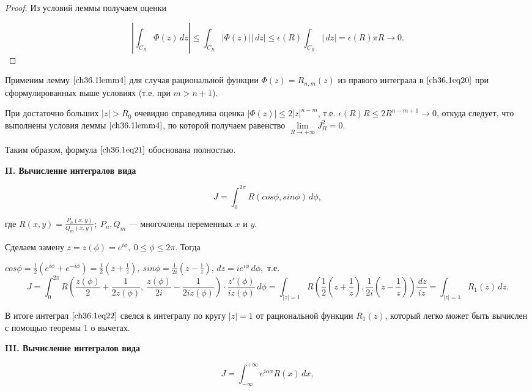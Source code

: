 \begin{proof}
Из условий леммы получаем оценки

$$
\left| \int_{C_R} \Phi(z)\,dz \right| \le \int_{C_R} |\Phi(z)||\,dz| \le \epsilon(R) \int_{C_R}|\,dz| = \epsilon(R)\pi R \to 0.
$$

\end{proof}

Применим лемму $\eqref{ch36.1lemm4}$ для случая рациональной функции $\Phi(z) = R_{n,m}(z)$ из правого интеграла в $\eqref{ch36.1eq20}$ при сформулированных выше условиях (т.е. при $m > n + 1$).

При достаточно больших $|z| > R_0$ очевидно справедлива оценка $|\Phi(z)| \le 2|z|^{n - m}$, т.е.
$\epsilon(R)R \le 2R^{n - m + 1} \to 0$, откуда следует, что выполнены условия леммы $\eqref{ch36.1lemm4}$, по которой получаем равенство $\lim\limits_{R \to +\infty} J_R^2 = 0$.

Таким образом, формула $\eqref{ch36.1eq21}$ обоснована полностью.

{\bf II. Вычисление интегралов вида}

\begin{equation} \label{ch36.1eq22}
J = \int_{0}^{2\pi} R(cos \phi, sin\phi)\,d\phi,
\end{equation}

где $R(x,y) = \frac{P_n(x,y)}{Q_m(x,y)}; \: P_n, Q_m$ --- многочлены переменных $x$ и $y$.

Сделаем замену $z = z(\phi) = e^{i \phi}, \: 0 \le \phi \le 2\pi$. Тогда 

$cos\phi = \frac{1}{2} (e^{i\phi} + e^{-i\phi}) = \frac{1}{2}\left( z + \frac{1}{z}\right), \: sin\phi = \frac{1}{2i} \left(z - \frac{1}{z} \right), \,dz = i e^{i \phi} \,d\phi,$ т.е. 
$$
J = \int_0^{2\pi} R\left( \frac{z(\phi)}{2} + \frac{1}{2z(\phi)}, \: \frac{z(\phi)}{2i} - \frac{1}{2iz(\phi)}\right) \cdot \frac{z'(\phi)}{iz(\phi)} \,d\phi = \int_{|z| = 1} R\left( \frac{1}{2} \left( z + \frac{1}{z}\right), \frac{1}{2i}\left( z - \frac{1}{z}\right)\right)\frac{\,dz}{iz} = \int_{|z| = 1} R_1(z)\,dz.
$$

В итоге интеграл $\eqref{ch36.1eq22}$ свелся к интегралу по кругу $|z| = 1$ от рациональной функции $R_1(z)$, который легко может быть вычислен с помощью теоремы 1 о вычетах.

{\bf III. Вычисление интегралов вида}

\begin{equation} \label{ch36.1eq23}
J = \int_{-\infty}^{+\infty} e^{i\alpha x} R(x) \,dx,
\end{equation}

